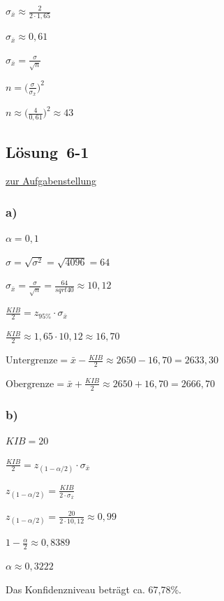 \documentclass[
  11pt,
  ngerman,
  a4paper,
]{report}
\begin{document}
\(\sigma_{\bar{x}} \approx \frac{2}{2 \cdot 1{,}65}\)

\(\sigma_{\bar{x}} \approx 0{,}61\)

\(\sigma_{\bar{x}}=\frac{\sigma}{\sqrt{n}}\)

\(n = \big(\frac{\sigma}{\sigma_{\bar{x}}}\big)^2\)

\(n \approx \big(\frac{4}{0{,}61}\big)^2\approx43\)

\hypertarget{loesung-6-1}{%
\subsection{Lösung~6-1}\label{loesung-6-1}}

\protect\hyperlink{aufgabe-6-1}{zur Aufgabenstellung}

\hypertarget{a-16}{%
\subsubsection{a)}\label{a-16}}

\(\alpha=0{,}1\)

\(\sigma=\sqrt{\sigma^2}=\sqrt{4096}=64\)

\(\sigma_{\bar{x}}=\frac{\sigma}{\sqrt{n}}=\frac{64}{sqrt{40}}\approx10{,}12\)

\(\frac{\mathit{KIB}}{2}=z_{95\%} \cdot \sigma_{\bar{x}}\)

\(\frac{\mathit{KIB}}{2}\approx 1{,}65 \cdot 10{,}12\approx16{,}70\)

\(\textrm{Untergrenze} = \bar{x} - \frac{\mathit{KIB}}{2} \approx 2650 - 16{,}70 = 2633{,}30\)

\(\textrm{Obergrenze} = \bar{x} + \frac{\mathit{KIB}}{2} \approx 2650 + 16{,}70 = 2666{,}70\)

\hypertarget{b-17}{%
\subsubsection{b)}\label{b-17}}

\(\mathit{KIB}=20\)

\(\frac{\mathit{KIB}}{2}=z_{(1-\alpha/2)} \cdot \sigma_{\bar{x}}\)

\(z_{(1-\alpha/2)}=\frac{\mathit{KIB}}{2\cdot \sigma_{\bar{x}}}\)

\(z_{(1-\alpha/2)}=\frac{20}{2 \cdot 10{,}12}\approx0{,}99\)

\(1-\frac{\alpha}{2}\approx0{,}8389\)

\(\alpha\approx 0{,}3222\)

Das Konfidenzniveau beträgt ca. 67,78\%.
\end{document}
